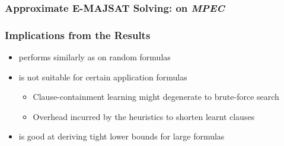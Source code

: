 \begin{frame}
    \frametitle{Approximate E-MAJSAT Solving: \erssatb on \textit{MPEC}}
    \begin{table}[ht]
        \centering
        \scriptsize
    \end{table}
\end{frame}

\begin{frame}
    \frametitle{Implications from the Results}
    \begin{itemize}
        \item \erssat performs similarly as \dcssat on random formulas
              \pause
        \item \erssat is not suitable for certain application formulas
              \pause
              \begin{itemize}
                  \item Clause-containment learning might degenerate to brute-force search
                        \pause
                  \item Overhead incurred by the heuristics to shorten learnt clauses
                        \pause
              \end{itemize}
        \item \erssat is good at deriving tight lower bounds for large formulas
    \end{itemize}
\end{frame}